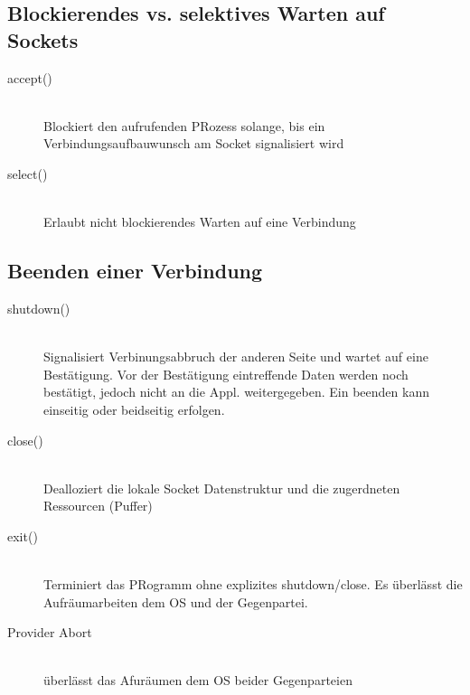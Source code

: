 \documentclass[10pt]{article}
\begin{document}
\subsection{Blockierendes vs. selektives Warten auf Sockets}
\begin{description}
	\item[accept()] \hfill \\ Blockiert den aufrufenden PRozess solange, bis ein Verbindungsaufbauwunsch am Socket signalisiert wird
	\item[select()] \hfill \\ Erlaubt nicht blockierendes Warten auf eine Verbindung
\end{description}

\subsection{Beenden einer Verbindung}
\begin{description}
	\item[shutdown()] \hfill \\ Signalisiert Verbinungsabbruch der anderen Seite und wartet auf eine Bestätigung. Vor der Bestätigung eintreffende Daten werden noch bestätigt, jedoch nicht an die Appl. weitergegeben. Ein beenden kann einseitig oder beidseitig erfolgen.
	\item[close()] \hfill \\ Dealloziert die lokale Socket Datenstruktur und die zugerdneten Ressourcen (Puffer)
	\item[exit()] \hfill \\ Terminiert das PRogramm ohne explizites shutdown/close. Es überlässt die Aufräumarbeiten dem OS und der Gegenpartei.
	\item[Provider Abort] \hfill \\ überlässt das Afuräumen dem OS beider Gegenparteien
\end{description}
\end{document}
